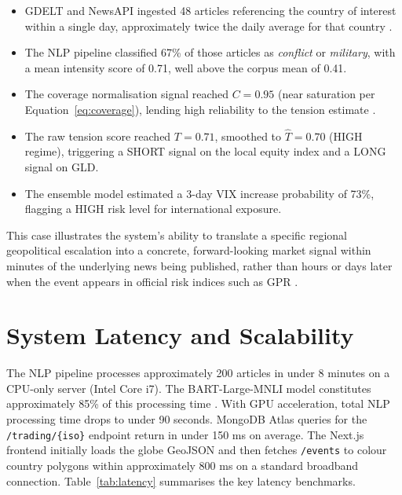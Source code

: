 \documentclass[12pt,a4paper]{report}
\begin{document}
\begin{itemize}
  \item GDELT and NewsAPI ingested 48 articles referencing the country
        of interest within a single day, approximately twice the daily
        average for that country \cite{leetaru2013}.
  \item The NLP pipeline classified 67\% of those articles as
        \emph{conflict} or \emph{military}, with a mean intensity score
        of 0.71, well above the corpus mean of 0.41.
  \item The coverage normalisation signal reached $C = 0.95$ (near
        saturation per Equation~\ref{eq:coverage}), lending high
        reliability to the tension estimate \cite{manela2017}.
  \item The raw tension score reached $T = 0.71$, smoothed to
        $\hat{T} = 0.70$ (HIGH regime), triggering a SHORT signal on the
        local equity index and a LONG signal on GLD.
  \item The ensemble model estimated a 3-day VIX increase probability of
        73\%, flagging a HIGH risk level for international exposure.
\end{itemize}

This case illustrates the system's ability to translate a specific
regional geopolitical escalation into a concrete, forward-looking market
signal within minutes of the underlying news being published, rather than
hours or days later when the event appears in official risk indices such
as GPR \cite{caldara2022}.

\section{System Latency and Scalability}

The NLP pipeline processes approximately 200 articles in under 8 minutes
on a CPU-only server (Intel Core i7). The BART-Large-MNLI model
constitutes approximately 85\% of this processing time \cite{lewis2020}.
With GPU acceleration, total NLP processing time drops to under 90
seconds. MongoDB Atlas queries for the \texttt{/trading/\{iso\}} endpoint
return in under 150 ms on average. The Next.js frontend initially loads
the globe GeoJSON and then fetches \texttt{/events} to colour country
polygons within approximately 800 ms on a standard broadband connection.
Table~\ref{tab:latency} summarises the key latency benchmarks.
\end{document}
